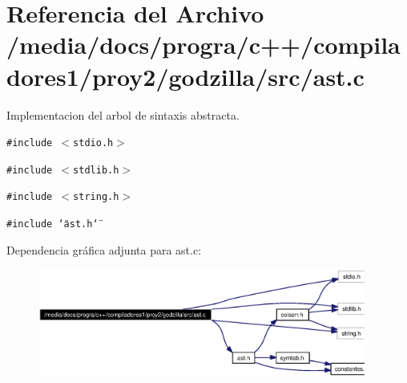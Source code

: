 \section{Referencia del Archivo /media/docs/progra/c++/compiladores1/proy2/godzilla/src/ast.c}
\label{ast_8c}
Implementacion del arbol de sintaxis abstracta. 

{\tt \#include $<$stdio.h$>$}\par
{\tt \#include $<$stdlib.h$>$}\par
{\tt \#include $<$string.h$>$}\par
{\tt \#include \char`\"{}ast.h\char`\"{}}\par


Dependencia gr\'{a}fica adjunta para ast.c:\begin{figure}[H]
\begin{center}
\leavevmode
\includegraphics[width=305pt]{ast_8c__incl}
\end{center}
\end{figure}
